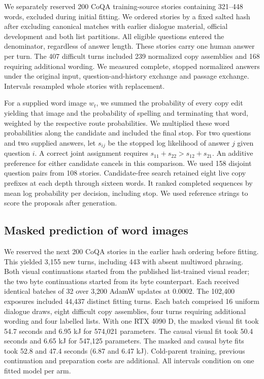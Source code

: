 \documentclass[12pt,a4paper]{article}
\providecommand{\DIFadd}[1]{{\protect\color{blue} \sf #1}} %
\begin{document}
\DIFadd{We separately reserved 200 CoQA training-source stories containing 321--448 words, excluded during initial fitting. We ordered stories by a fixed salted hash after excluding canonical matches with earlier dialogue material, official development and both list partitions. All eligible questions entered the denominator, regardless of answer length. These stories carry one human answer per turn. The 407 difficult turns included 239 normalized copy assemblies and 168 requiring additional wording. We measured complete, stopped normalized answers under the original input, question-and-history exchange and passage exchange. Intervals resampled whole stories with replacement.
}

\DIFadd{For a supplied word image $w_t$, we summed the probability of every copy edit yielding that image and the probability of spelling and terminating that word, weighted by the respective route probabilities. We multiplied these word probabilities along the candidate and included the final stop. For two questions and two supplied answers, let $s_{ij}$ be the stopped log likelihood of answer $j$ given question $i$. A correct joint assignment requires $s_{11}+s_{22}>s_{12}+s_{21}$. An additive preference for either candidate cancels in this comparison. We used 158 disjoint question pairs from 108 stories. Candidate-free search retained eight live copy prefixes at each depth through sixteen words. It ranked completed sequences by mean log probability per decision, including stop. We used reference strings to score the proposals after generation.
}

\subsection*{\DIFadd{Masked prediction of word images}}
\DIFadd{We reserved the next 200 CoQA stories in the earlier hash ordering before fitting. This yielded 3,155 new turns, including 443 with absent multiword phrasing. Both visual continuations started from the published list-trained visual reader; the two byte continuations started from its byte counterpart. Each received identical batches of 32 over 3,200 AdamW updates at 0.0002. The 102,400 exposures included 44,437 distinct fitting turns. Each batch comprised 16 uniform dialogue draws, eight difficult copy assemblies, four turns requiring additional wording and four labelled lists. With one RTX 4090 D, the masked visual fit took 54.7 seconds and 6.95 kJ for 574,021 parameters. The causal visual fit took 50.4 seconds and 6.65 kJ for 547,125 parameters. The masked and causal byte fits took 52.8 and 47.4 seconds (6.87 and 6.47 kJ). Cold-parent training, previous continuation and preparation costs are additional. All intervals condition on one fitted model per arm.
}
\end{document}
